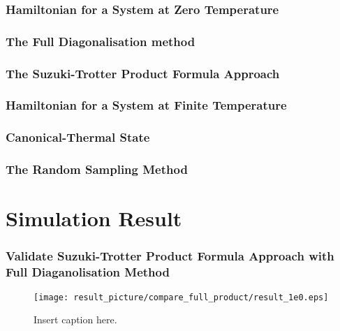 \documentclass{beamer}
\begin{document}
\begin{frame}
	\frametitle{Hamiltonian for a System at Zero Temperature}
\end{frame}

\begin{frame}
	\frametitle{The Full Diagonalisation method}
\end{frame}

\begin{frame}
	\frametitle{The Suzuki-Trotter Product Formula Approach}
\end{frame}

\begin{frame}
	\frametitle{Hamiltonian for a System at Finite Temperature}
\end{frame}

\begin{frame}
	\frametitle{Canonical-Thermal State}
\end{frame}

\begin{frame}
	\frametitle{The Random Sampling Method}
\end{frame}



\section{Simulation Result}
\begin{frame}
		\frametitle{Validate Suzuki-Trotter Product Formula Approach with Full Diaganolisation Method}
		\begin{figure}[h]
			\centering
			\texttt{[image: result\_picture/compare\_full\_product/result\_1e0.eps]}
			\caption{Insert caption here.}
			
		\end{figure}
\end{frame}
\end{document}
